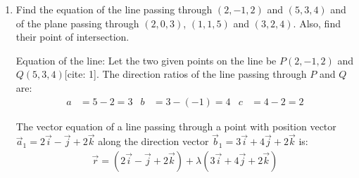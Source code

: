 \begin{enumerate}[label=\thesubsection.\arabic*, ref=\thesubsection.\theenumi]
Since this plane passes through the point $(2, 3, 7)$ with position vector $\vec{a}_2 = 2\vec{i} + 3\vec{j} + 7\vec{k}$:
\begin{align*}
	d = 9(2) + 3(3) - (7) = 18 + 9 - 7 = 20
\end{align*}

Parallel plane equations:

Vector equation:
\begin{align*}
	\vec{r} \cdot (9\vec{i} + 3\vec{j} - \vec{k}) = 20
\end{align*}

Cartesian equation:
\begin{align*}
	9x + 3y - z = 20 
\end{align*}

The Cartesian equations of the two parallel planes are:
\begin{align*}
	\Pi_1 &: 9x + 3y - z - 14 = 0 \\
	\Pi_2 &: 9x + 3y - z - 20 = 0
\end{align*}

The perpendicular distance $D$ between two parallel planes $Ax + By + Cz + D_1 = 0$ and $Ax + By + Cz + D_2 = 0$ is given by:
\begin{align*}
	D = \frac{|D_1 - D_2|}{\sqrt{A^2 + B^2 + C^2}}
\end{align*}

Substituting $A = 9$, $B = 3$, $C = -1$, $D_1 = -14$, and $D_2 = -20$:
\begin{align*}
	D &= \frac{|-14 - (-20)|}{\sqrt{9^2 + 3^2 + (-1)^2}} 
	= \frac{|-14 + 20|}{\sqrt{81 + 9 + 1}} 
	= \frac{6}{\sqrt{91}}\text{ units}
\end{align*}




\item Find the equation of the line passing through $(2,-1,2)$ and $(5,3,4)$ and of the plane passing through $(2,0,3)$, $(1,1,5)$ and $(3,2,4)$. Also, find their point of intersection.

\solution
Equation of the line:
Let the two given points on the line be $P(2, -1, 2)$ and $Q(5, 3, 4)$[cite: 1].
The direction ratios of the line passing through $P$ and $Q$ are:
\begin{align*}
	a &= 5 - 2 = 3 &
	b &= 3 - (-1) = 4 &
	c &= 4 - 2 = 2
\end{align*}

The vector equation of a line passing through a point with position vector $\vec{a}_1 = 2\vec{i} - \vec{j} + 2\vec{k}$ along the direction vector $\vec{b}_1 = 3\vec{i} + 4\vec{j} + 2\vec{k}$ is:
\begin{align*}
	\vec{r} = (2\vec{i} - \vec{j} + 2\vec{k}) + \lambda(3\vec{i} + 4\vec{j} + 2\vec{k})
\end{align*}


\end{enumerate}
